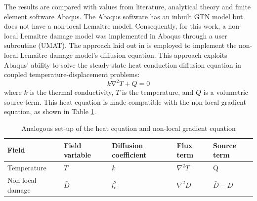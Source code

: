 \documentclass[sn-mathphys,Numbered]{sn-jnl}%
\begin{document}
\begin{appendices}
The results are compared with values from literature, analytical theory and finite element software Abaqus.
The Abaqus software has an inbuilt GTN model but does not have a non-local Lemaitre model.
Consequently, for this work, a non-local Lemaitre damage model was implemented in Abaqus through a user subroutine (UMAT).
The approach laid out in \citet{azinpour_simple_2018} is employed to implement the non-local Lemaitre damage model's diffusion equation.
This approach exploits Abaqus' ability to solve the steady-state heat conduction diffusion equation in coupled temperature-displacement problems:
\begin{equation}
    k\mathrm{\nabla}^2T + Q = 0
\end{equation}
where $k$ is the thermal conductivity, $T$ is the temperature, and $Q$ is a volumetric source term.
This heat equation is made compatible with the non-local gradient equation, as shown in Table \ref{tab:diffusion_equation_comparison}.
\begin{table}[htb]
	\centering
		\begin{tabular}{lllll} \hline
			Field & Field variable & Diffusion coefficient & Flux term & Source term \\ \hline 
			Temperature & $T$ & $k$ & $\nabla^2T$ & Q \\
			Non-local damage & $\bar{D}$ & $l^{2}_c$ & $\nabla^2D$ &  $\bar{D}-D$\\
            \hline
		\end{tabular}
	\caption{Analogous set-up of the heat equation and non-local gradient equation}
	\label{tab:diffusion_equation_comparison}
\end{table}






\end{appendices}
\end{document}
